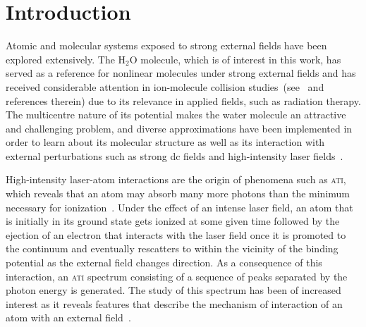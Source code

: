 \chapter{Introduction}
\label{cha:introduction}



Atomic and molecular systems exposed to strong external fields have
been explored extensively. The H$_{2}$O molecule, which is of interest
in this work, has served as a reference for nonlinear molecules under
strong external fields and has received considerable attention in
ion-molecule collision
studies~(see~\cite{horbatsch_2012col,illescas_2013} and references
therein) due to its relevance in applied fields, such as radiation
therapy.  The multicentre nature of its potential makes the water
molecule an attractive and challenging problem, and diverse
approximations have been implemented in order to learn about its
molecular structure as well as its interaction with external
perturbations such as strong dc fields and high-intensity laser
fields~\cite{Jagau_manybody_H2O,Toru_weakF_H2O,Krause2015_CAP_H2O,Zhao_2011_H2Otunneling,Petretti_H2O_laser}.

High-intensity laser-atom interactions are the origin of phenomena
such as \textsc{ati}, which reveals that an atom may absorb many more
photons than the minimum necessary for ionization~\cite{ATI1979}.
Under the effect of an intense laser field, an atom that is initially
in its ground state gets ionized at some given time followed by the
ejection of an electron that interacts with the laser field once it is
promoted to the continuum and eventually rescatters to within the
vicinity of the binding potential as the external field changes
direction. As a consequence of this interaction, an \textsc{ati}
spectrum consisting of a sequence of peaks separated by the photon
energy is generated. The study of this spectrum has been of increased
interest as it reveals features that describe the mechanism of
interaction of an atom with an external
field~\cite{BeckerRescattering_2018,Becker_ati2002}.

